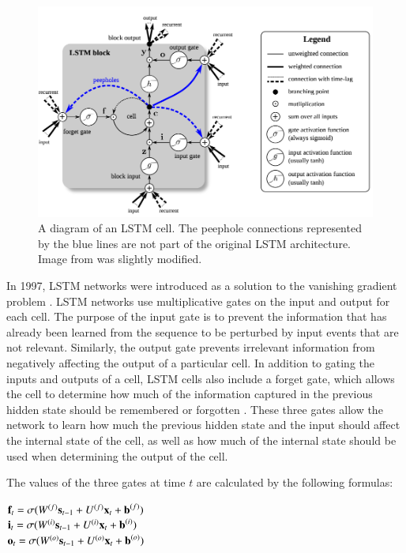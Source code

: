 \begin{figure}[t]
    \includegraphics[width=\textwidth]{lstm}
    \caption{A diagram of an LSTM cell. The peephole connections represented by the blue lines are not part of the original LSTM architecture. Image from \cite{greff2016lstm} was slightly modified.}
    \label{fig:lstm}
\end{figure}

In 1997, \ac{LSTM} networks were introduced as a solution to the vanishing gradient problem \cite{hochreiter:nc97}. \ac{LSTM} networks use multiplicative gates on the input and output for each cell. The purpose of the input gate is to prevent the information that has already been learned from the sequence to be perturbed by input events that are not relevant. Similarly, the output gate prevents irrelevant information from negatively affecting the output of a particular cell. In addition to gating the inputs and outputs of a cell, \ac{LSTM} cells also include a forget gate, which allows the cell to determine how much of the information captured in the previous hidden state should be remembered or forgotten \cite{gers1999learning}. These three gates allow the network to learn how much the previous hidden state and the input should affect the internal state of the cell, as well as how much of the internal state should be used when determining the output of the cell.

The values of the three gates at time $t$ are calculated by the following formulas:
\begin{center}
    $\text{{\bf f}}_t = \sigma(W^{(f)}\text{{\bf s}}_{t-1} + U^{(f)}\text{{\bf x}}_{t} + \text{{\bf b}}^{(f)})$\\
    $\text{{\bf i}}_t = \sigma(W^{(i)}\text{{\bf s}}_{t-1} + U^{(i)}\text{{\bf x}}_{t} + \text{{\bf b}}^{(i)})$\\
    $\text{{\bf o}}_t = \sigma(W^{(o)}\text{{\bf s}}_{t-1} + U^{(o)}\text{{\bf x}}_{t} + \text{{\bf b}}^{(o)})$\\
\end{center}

